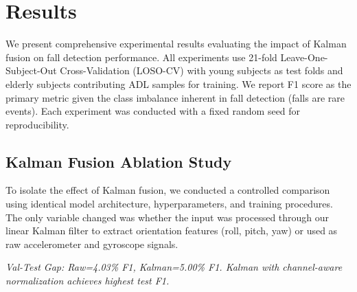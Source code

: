 \section{Results}
\label{sec:Results}

We present comprehensive experimental results evaluating the impact of Kalman fusion on fall detection performance. All experiments use 21-fold Leave-One-Subject-Out Cross-Validation (LOSO-CV) with young subjects as test folds and elderly subjects contributing ADL samples for training. We report F1 score as the primary metric given the class imbalance inherent in fall detection (falls are rare events). Each experiment was conducted with a fixed random seed for reproducibility.

\subsection{Kalman Fusion Ablation Study}
\label{sec:kalman_ablation}

To isolate the effect of Kalman fusion, we conducted a controlled comparison using identical model architecture, hyperparameters, and training procedures. The only variable changed was whether the input was processed through our linear Kalman filter to extract orientation features (roll, pitch, yaw) or used as raw accelerometer and gyroscope signals.

\begin{table}[htbp]
\centering
\caption{Transformer: Kalman vs Raw Input - Complete Metrics (21-fold LOSO-CV)}
\label{tab:kalman_vs_raw}
\vspace{1mm}
\scriptsize
\textit{Val-Test Gap: Raw=4.03\% F1, Kalman=5.00\% F1. Kalman with channel-aware normalization achieves highest test F1.}
\end{table}

